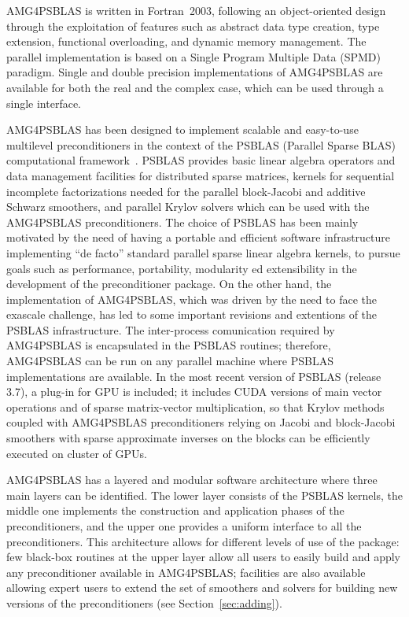 AMG4PSBLAS is written in Fortran~2003, following an
object-oriented design through the exploitation of features
such as abstract data type creation, type extension, functional overloading, and
dynamic memory management.
The parallel implementation is based on a Single Program Multiple Data
(SPMD) paradigm.  Single and
double precision implementations of AMG4PSBLAS are available for both the
real and the complex case, which can be used through a single
interface.

AMG4PSBLAS has been designed to implement scalable and easy-to-use
multilevel preconditioners in the context of the PSBLAS (Parallel Sparse BLAS)
computational framework~\cite{psblas_00,PSBLAS3}. PSBLAS provides basic linear algebra
operators and data management facilities for distributed sparse matrices,
kernels for sequential incomplete factorizations needed for the
parallel block-Jacobi and additive Schwarz smoothers, and 
parallel Krylov solvers which can be used with the AMG4PSBLAS preconditioners.
The choice of PSBLAS has been mainly motivated by the need of having
a portable and efficient software infrastructure implementing ``de facto'' standard
parallel sparse linear algebra kernels, to pursue goals such as performance,
portability, modularity ed extensibility in the development of the preconditioner
package. On the other hand, the implementation of AMG4PSBLAS, which
was driven by the need to face the exascale challenge, has led to some
important  revisions and extentions of the PSBLAS infrastructure. 
The inter-process comunication required by AMG4PSBLAS is encapsulated
in the PSBLAS routines;
therefore, AMG4PSBLAS can be run on any parallel machine where PSBLAS 
implementations are available. In the most recent version of PSBLAS
(release 3.7), a plug-in for GPU is included; it includes CUDA
versions of main vector operations and of sparse matrix-vector
multiplication, so that Krylov methods coupled with AMG4PSBLAS
preconditioners    relying on Jacobi and block-Jacobi smoothers with
sparse approximate inverses on the blocks can be efficiently executed
on cluster of GPUs. 

AMG4PSBLAS has a layered and modular software architecture where three main layers can be
identified.  The lower layer consists of the PSBLAS kernels, the middle one implements
the construction and application phases of the preconditioners, and the upper one
provides a uniform interface to all the preconditioners.
This architecture allows for different levels of use of the package:
few black-box routines at the upper layer allow all users to easily
build and apply any preconditioner available in AMG4PSBLAS;
facilities are also available allowing expert users to extend the set of smoothers
and solvers for building new versions of the preconditioners (see
Section~\ref{sec:adding}).

